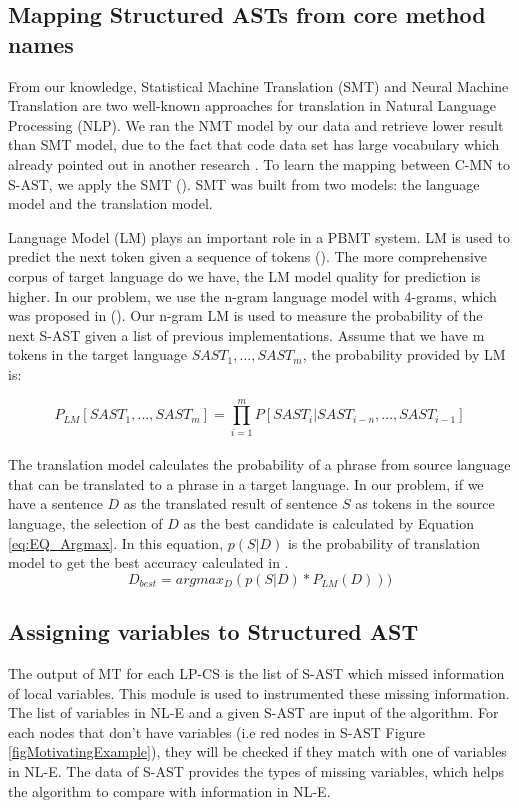 \documentclass[sigconf,review,anonymous]{article}
\begin{document}
\subsection{Mapping Structured ASTs from core method names}
From our knowledge, Statistical Machine Translation (SMT) \cite{015} and Neural Machine Translation \cite{019} are two well-known approaches for translation in Natural Language Processing (NLP). We ran the NMT model by our data and retrieve lower result than SMT model, due to the fact that code data set has large vocabulary which already pointed out in another research \cite{013}. To learn the mapping between C-MN to S-AST, we apply the SMT (\cite{015}). SMT was built from two models: the language model and the translation model. 

Language Model (LM) plays an important role in a PBMT system. LM is used to predict the next token given a sequence of tokens (\cite{016}). The more comprehensive corpus of target language do we have, the LM model quality for prediction is higher.  In our problem, we use the n-gram language model with 4-grams, which was proposed in (\cite{017}). Our n-gram LM is used to measure the probability of the next S-AST given a list of previous implementations. Assume that we have m tokens in the target language \({SAST_{1},...,SAST_{m}}\), the probability provided by LM is:

\begin{equation} 
\label{eq:EQ_Probability}
 P_{LM}[SAST_{1}, ...,SAST_{m}]=\prod_{i=1}^{m}P[SAST_{i} | SAST_{i-n},...,SAST_{i-1}]
\end{equation}
\\

The translation model calculates the probability of a phrase from source language that can be translated to a phrase in a target language. In our problem, if we have a sentence   \({D}\) as the translated result of sentence \({S}\) as tokens in the source language, the selection of \({D}\) as the best candidate is calculated by Equation \ref{eq:EQ_Argmax}. In this equation, \({p(S|D)}\) is the probability of translation model to get the best accuracy calculated in \cite{016}.
\begin{equation} 
\label{eq:EQ_Argmax}
 D_{best}=argmax_{D}(p(S|D)*P_{LM}(D)))
\end{equation}


\subsection{Assigning variables to Structured AST}
The output of MT for each LP-CS is the list of S-AST which missed information of local variables. This module is used to instrumented these missing information. The list of variables in NL-E and a given S-AST are input of the algorithm. For each nodes that don't have variables (i.e red nodes in S-AST Figure \ref{figMotivatingExample}), they will be checked if they match with one of variables in NL-E. The data of S-AST provides the types of missing variables, which helps the algorithm to compare with information in NL-E.
\end{document}

